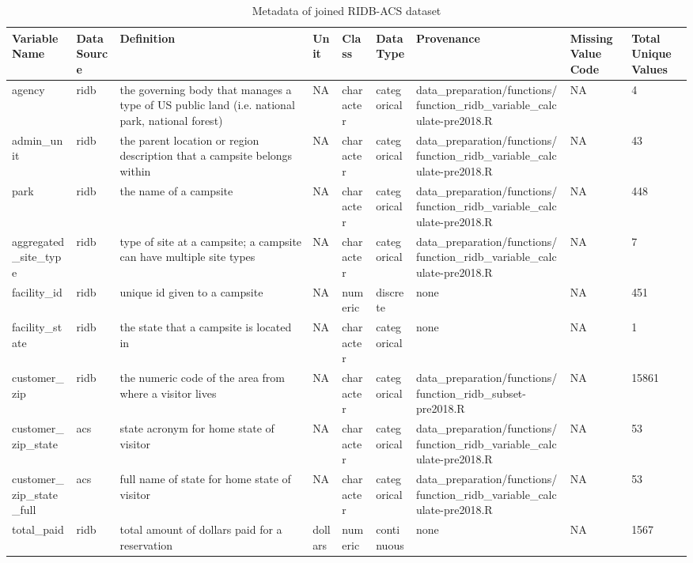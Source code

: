 \documentclass[
  11 pt,
  openany]{book}
\begin{document}
\begin{table}

\caption{\label{tab:unnamed-chunk-4}Metadata of joined RIDB-ACS dataset}
\begin{tabular}[t]{l|l|l|l|l|l|l|l|l}
\hline
Variable Name & Data Source & Definition & Unit & Class & Data Type & Provenance & Missing Value Code & Total Unique Values\\
\hline
agency & ridb & the governing body that manages a type of US public land (i.e. national park, national forest) & NA & character & categorical & data\_preparation/functions/function\_ridb\_variable\_calculate-pre2018.R & NA & 4\\
\hline
admin\_unit & ridb & the parent location or region description that a campsite belongs within & NA & character & categorical & data\_preparation/functions/function\_ridb\_variable\_calculate-pre2018.R & NA & 43\\
\hline
park & ridb & the name of a campsite & NA & character & categorical & data\_preparation/functions/function\_ridb\_variable\_calculate-pre2018.R & NA & 448\\
\hline
aggregated\_site\_type & ridb & type of site at a campsite; a campsite can have multiple site types & NA & character & categorical & data\_preparation/functions/function\_ridb\_variable\_calculate-pre2018.R & NA & 7\\
\hline
facility\_id & ridb & unique id given to a campsite & NA & numeric & discrete & none & NA & 451\\
\hline
facility\_state & ridb & the state that a campsite is located in & NA & character & categorical & none & NA & 1\\
\hline
customer\_zip & ridb & the numeric code of the area from where a visitor lives & NA & character & categorical & data\_preparation/functions/function\_ridb\_subset-pre2018.R & NA & 15861\\
\hline
customer\_zip\_state & acs & state acronym for home state of visitor & NA & character & categorical & data\_preparation/functions/function\_ridb\_variable\_calculate-pre2018.R & NA & 53\\
\hline
customer\_zip\_state\_full & acs & full name of state for home state of visitor & NA & character & categorical & data\_preparation/functions/function\_ridb\_variable\_calculate-pre2018.R & NA & 53\\
\hline
total\_paid & ridb & total amount of dollars paid for a reservation & dollars & numeric & continuous & none & NA & 1567\\

\end{tabular}
\end{table}
\end{document}
